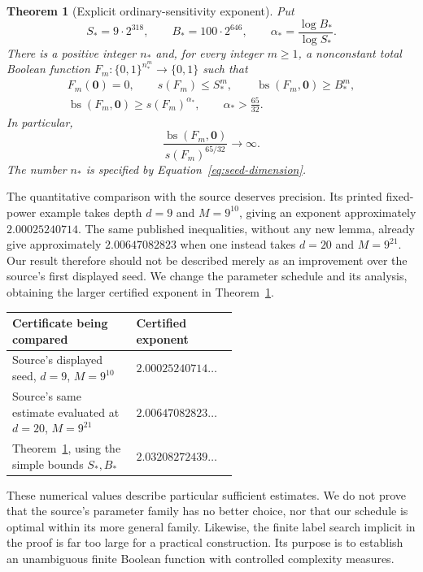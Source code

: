 \documentclass[11pt]{article}
\newtheorem{theorem}{Theorem}[section]
\theoremstyle{definition}
\theoremstyle{remark}
\DeclareMathOperator{\bs}{bs}
\newcommand{\sens}{s}
\newcommand{\bits}{\{0,1\}}
\newcommand{\zero}{\mathbf{0}}
\begin{document}
\begin{theorem}[Explicit ordinary-sensitivity exponent]
\label{thm:main}
Put
\[
 S_*=9\cdot2^{318},\qquad B_*=100\cdot2^{646},\qquad
 \alpha_*=\frac{\log B_*}{\log S_*}.
\]
There is a positive integer $n_*$ and, for every integer $m\ge1$, a
nonconstant total Boolean function
$F_m:\bits^{n_*^m}\to\bits$ such that
\begin{gather}
 F_m(\zero)=0,\qquad
 \sens(F_m)\le S_*^m,\qquad
 \bs(F_m,\zero)\ge B_*^m,
 \label{eq:main-bounds}\\
 \bs(F_m,\zero)\ge \sens(F_m)^{\alpha_*},\qquad
 \alpha_*>\frac{65}{32}.
 \label{eq:main-exponent}
\end{gather}
In particular,
\[
 \frac{\bs(F_m,\zero)}{\sens(F_m)^{65/32}}
 \longrightarrow\infty.
\]
The number $n_*$ is specified by Equation~\eqref{eq:seed-dimension}.
\end{theorem}

The quantitative comparison with the source deserves precision.  Its
printed fixed-power example takes depth $d=9$ and $M=9^{10}$, giving an
exponent approximately $2.00025240714$.  The same published inequalities,
without any new lemma, already give approximately $2.00647082823$ when
one instead takes $d=20$ and $M=9^{21}$.  Our result therefore should not be
described merely as an improvement over the source's first displayed
seed.  We change the parameter schedule and its analysis, obtaining the
larger certified exponent in Theorem~\ref{thm:main}.

\begin{center}
\begin{tabular}{@{}p{0.55\linewidth}l@{}}
\toprule
Certificate being compared & Certified exponent\\
\midrule
Source's displayed seed, $d=9$, $M=9^{10}$
  & $2.00025240714\ldots$\\
Source's same estimate evaluated at $d=20$, $M=9^{21}$
  & $2.00647082823\ldots$\\
Theorem~\ref{thm:main}, using the simple bounds $S_*,B_*$
  & $2.03208272439\ldots$\\
\bottomrule
\end{tabular}
\end{center}

These numerical values describe particular sufficient estimates.  We do
not prove that the source's parameter family has no better choice, nor
that our schedule is optimal within its more general family.  Likewise,
the finite label search implicit in the proof is far too large for a
practical construction.  Its purpose is to establish an unambiguous
finite Boolean function with controlled complexity measures.
\end{document}
